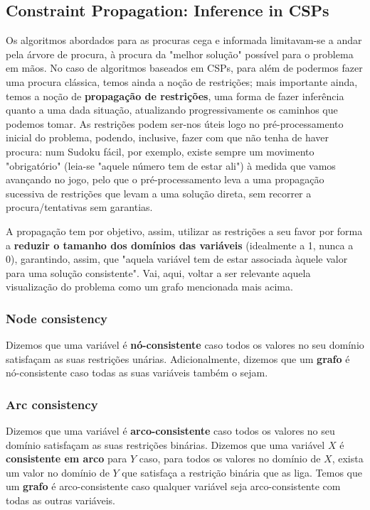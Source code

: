 \documentclass[11pt]{article}
\begin{document}
\subsection{Constraint Propagation: Inference in CSPs}

Os algoritmos abordados para as procuras cega e informada limitavam-se a andar pela árvore de procura, à procura da "melhor solução" possível para o problema em mãos. No caso de algoritmos baseados em CSPs, para além de podermos fazer uma procura clássica, temos ainda a noção de restrições; mais importante ainda, temos a noção de \textbf{propagação de restrições}, uma forma de fazer inferência quanto a uma dada situação, atualizando progressivamente os caminhos que podemos tomar. As restrições podem ser-nos úteis logo no pré-processamento inicial do problema, podendo, inclusive, fazer com que não tenha de haver procura: num Sudoku fácil, por exemplo, existe sempre um movimento "obrigatório" (leia-se "aquele número tem de estar ali") à medida que vamos avançando no jogo, pelo que o pré-processamento leva a uma propagação sucessiva de restrições que levam a uma solução direta, sem recorrer a procura/tentativas sem garantias.\vspace{4pt}

A propagação tem por objetivo, assim, utilizar as restrições a seu favor por forma a \textbf{reduzir o tamanho dos domínios das variáveis} (idealmente a 1, nunca a 0), garantindo, assim, que "aquela variável tem de estar associada àquele valor para uma solução consistente". Vai, aqui, voltar a ser relevante aquela visualização do problema como um grafo mencionada mais acima.

\subsubsection{Node consistency}

Dizemos que uma variável é \textbf{nó-consistente} caso todos os valores no seu domínio satisfaçam as suas restrições unárias. Adicionalmente, dizemos que um \textbf{grafo} é nó-consistente caso todas as suas variáveis também o sejam.

\subsubsection{Arc consistency}

Dizemos que uma variável é \textbf{arco-consistente} caso todos os valores no seu domínio satisfaçam as suas restrições binárias. Dizemos que uma variável $X$ é \textbf{consistente em arco} para $Y$ caso, para todos os valores no domínio de $X$, exista um valor no domínio de $Y$ que satisfaça a restrição binária que as liga. Temos que um \textbf{grafo} é arco-consistente caso qualquer variável seja arco-consistente com todas as outras variáveis.\vspace{10pt}
\end{document}
